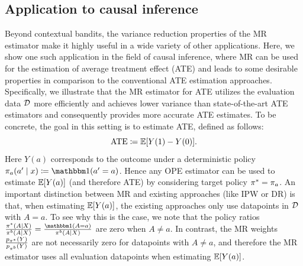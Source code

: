 \subsection{Application to causal inference}\label{subsec:application-to-causal-inference}
 Beyond contextual bandits, the variance reduction properties of the MR estimator make it highly useful in a wide variety of other applications. Here, we show one such application in the field of causal inference, where MR can be used for the estimation of average treatment effect (ATE) \cite{pearl2009causality} and leads to some desirable properties in comparison to the conventional ATE estimation approaches. Specifically, we illustrate that the MR estimator for ATE utilizes the evaluation data $\mathcal{D}$ more efficiently and achieves lower variance than state-of-the-art ATE estimators and consequently provides more accurate ATE estimates.
To be concrete, the goal in this setting is to estimate ATE, defined as follows:
\[
\textup{ATE} \coloneqq \mathbb{E}[Y(1)-Y(0)].
\]
Here $Y(a)$ corresponds to the outcome under a deterministic policy $\pi_a(a'\mid x) \coloneqq \ind(a'=a)$. Hence any OPE estimator can be used to estimate $\mathbb{E}[Y(a)]$ (and therefore ATE) by considering target policy $\pi^* = \pi_a$.
An important distinction between MR and existing approaches (like IPW or DR) is that, when estimating $\mathbb{E}[Y(a)]$, the existing approaches only use datapoints in $\mathcal{D}$ with $A=a$. To see why this is the case, we note that the policy ratios $\frac{\tar(A|X)}{\beh(A|X)} = \frac{\ind(A=a)}{\beh(A|X)}$ are zero when $A\neq a$. In contrast, the MR weights $\frac{p_{\pi^*}(Y)}{p_{\pi^b}(Y)}$ are not necessarily zero for datapoints with $A\neq a$, and therefore the MR estimator uses all evaluation datapoints when estimating $\mathbb{E}[Y(a)]$. 

